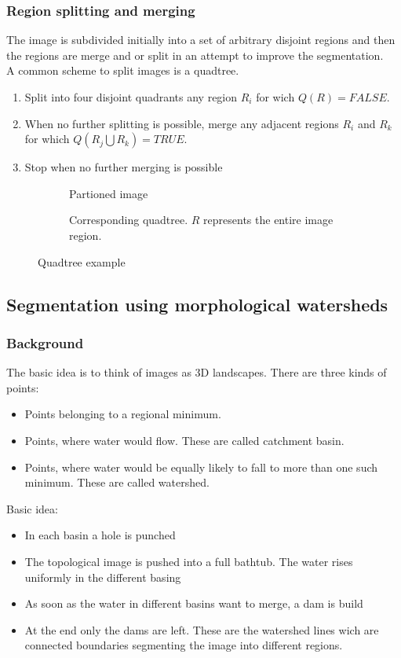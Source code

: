 \subsubsection{Region splitting and merging}
The image is subdivided initially into a set of arbitrary disjoint regions and then the regions are merge and or split in an attempt to improve the segmentation.\\
A common scheme to split images is a quadtree.\\
\begin{enumerate}
	\item Split into four disjoint quadrants any region $R_i$ for wich $Q(R)= FALSE$. 
	\item When no further splitting is possible, merge any adjacent regions $R_i$ and $R_k$ for which $Q(R_j\bigcup R_k) = TRUE$.
	\item Stop when no further merging is possible
\end{enumerate}
\begin{figure}[h]
	\centering
	\begin{subfigure}{0.3\textwidth}
		\centering
		
		\caption{Partioned image}
	\end{subfigure}
	\begin{subfigure}{0.5\textwidth}
		\centering
		
		\caption{Corresponding quadtree. $R$ represents the entire image region.}
	\end{subfigure}
	\caption{Quadtree example}
\end{figure}


\subsection{Segmentation using morphological watersheds}
\subsubsection{Background}
The basic idea is to think of images as 3D landscapes. There are three kinds of points:
\begin{itemize}
\item Points belonging to a regional minimum.
\item Points, where water would flow. These are called catchment basin.
\item Points, where water would be equally likely to fall to more than one such minimum. These are called watershed.
\end{itemize}
Basic idea:
\begin{itemize}
\item In each basin a hole is punched
\item The topological image is pushed into a full bathtub. The water rises uniformly in the different basing
\item As soon as the water in different basins want to merge, a dam is build
\item At the end only the dams are left. These are the watershed lines wich are connected boundaries segmenting the image into different regions.
\end{itemize}
